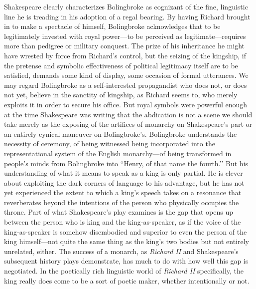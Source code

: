 Shakespeare clearly characterizes Bolingbroke as cognizant of the fine, linguistic line he is treading in his adoption of a regal bearing.
By having Richard brought in to make a spectacle of himself, Bolingbroke acknowledges that to be legitimately invested with royal power---to be perceived as legitimate---requires more than pedigree or military conquest.
The prize of his inheritance he might have wrested by force from Richard’s control, but the seizing of the kingship, if the pretense and symbolic effectiveness of political legitimacy itself are to be satisfied, demands some kind of display, some occasion of formal utterances.
We may regard Bolingbroke as a self-interested propagandist who does not, or does not yet, believe in the sanctity of kingship, as Richard seems to, who merely exploits it in order to secure his office.
But royal symbols were powerful enough at the time Shakespeare was writing that the abdication is not a scene we should take merely as the exposing of the artifices of monarchy on Shakespeare’s part or an entirely cynical maneuver on Bolingbroke’s.
Bolingbroke understands the necessity of ceremony, of being witnessed being incorporated into the representational system of the English monarchy---of being transformed in people’s minds from Bolingbroke into ``Henry, of that name the fourth.’’ But his understanding of what it means to speak as a king is only partial.
He is clever about exploiting the dark corners of language to his advantage, but he has not yet experienced the extent to which a king’s speech takes on a resonance that reverberates beyond the intentions of the person who physically occupies the throne.
Part of what Shakespeare’s play examines is the gap that opens up between the person who is king and the king-as-speaker, as if the voice of the king-as-speaker is somehow disembodied and superior to even the person of the king himself---not quite the same thing as the king’s two bodies but not entirely unrelated, either.
The success of a monarch, as \emph{Richard II} and Shakespeare’s subsequent history plays demonstrate, has much to do with how well this gap is negotiated.
In the poetically rich linguistic world of \emph{Richard II} specifically, the king really does come to be a sort of poetic maker, whether intentionally or not.

